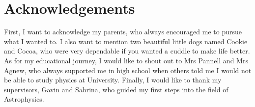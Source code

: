 \chapter{Acknowledgements}

First, I want to acknowledge my parents, who always encouraged me to pursue what I wanted to. I also want to mention two beautiful little dogs named Cookie and Cocoa, who were very dependable if you wanted a cuddle to make life better. As for my educational journey, I would like to shout out to Mrs Pannell and Mrs Agnew, who always supported me in high school when others told me I would not be able to study physics at University. Finally, I would like to thank my supervisors, Gavin and Sabrina, who guided my first steps into the field of Astrophysics.